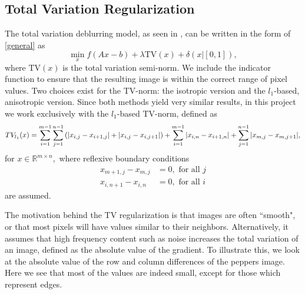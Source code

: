 \documentclass[10pt,a4paper]{article}
\newcommand{\R}{\mathbb{R}}
\begin{document}
	\subsection{Total Variation Regularization}
	The total variation deblurring model, as seen in \cite{TV}, can be written in the form of \eqref{general} as 
	\begin{equation} \label{tv_orig}
	\min_{x} f(Ax-b) +  \lambda \mathrm{TV}(x)+ \delta(x | [0,1]),
	\end{equation}
	where $\mathrm{TV}(x)$ is the total variation semi-norm.  We include the indicator function to ensure that the resulting image is within the correct range of pixel values.  Two choices exist for the TV-norm: the isotropic version and the $l_1$-based, anisotropic version. Since both methods yield very similar results, in this project we work exclusively with the $l_1$-based TV-norm, defined as 
	$$ TV_{l_1}(x) = \sum_{i=1}^{m-1} \sum_{j=1}^{n-1} \left( \abs{x_{i,j}  - x_{i+1,j} } + \abs{ x_{i,j} - x_{i,j+1}  } \right) + \sum_{i=1}^{m-1} \abs{ x_{i,n} - x_{i+1,n} } + \sum_{j=1}^{n-1} \abs{ x_{m,j} - x_{m,j+1 } },$$
	for $x \in \R^{m \times n},$ where reflexive boundary conditions
	\begin{align*}
	x_{m+1,j} - x_{m,j} &= 0, \textrm{ for all }j \\
	x_{i,n+1} - x_{i,n} &= 0, \textrm{ for all }i
	\end{align*}
	are assumed. 
	
	The motivation behind the TV regularization is that images are often ``smooth", or that most pixels will have values similar to their neighbors. Alternatively, it assumes that high frequency content such as noise increases the total variation of an image, defined as the absolute value of the gradient. To illustrate this, we look at the absolute value of the row and column differences of the peppers image. Here we see that most of the values are indeed small, except for those which represent edges. 
	
\end{document}
